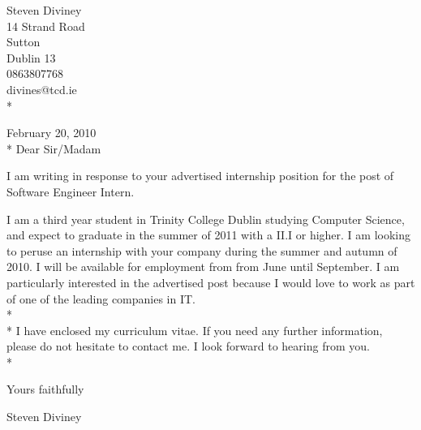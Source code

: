 \documentclass[a4paper,12pt]{article}
\begin{document}
\begin{flushright}
   Steven Diviney \\
   14 Strand Road \\
   Sutton \\
   Dublin 13 \\
   0863807768 \\
   divines@tcd.ie \\* \vspace{10 mm}
\end{flushright}
\begin{flushleft}
 
February 20, 2010\\*\vspace{10 mm}
Dear Sir/Madam
\end{flushleft}
I am writing in response to your advertised internship position for the post of Software Engineer Intern.

I am a third year student in Trinity College Dublin studying Computer Science, and expect to graduate in the summer of 2011 with a II.I or higher.
I am looking to peruse an internship with your company during the summer and autumn of 2010. 
I will be available for employment from from June until September. I am particularly interested in the advertised post because I would love to work as part of one of the leading companies in IT.
\\*
\\*
I have enclosed my curriculum vitae. If you need any further information, please do not hesitate to contact me. I look forward to hearing from you.\\*

\begin{flushleft}
Yours faithfully\\\vspace{10mm}

Steven Diviney\\
\end{flushleft}
\end{document}
